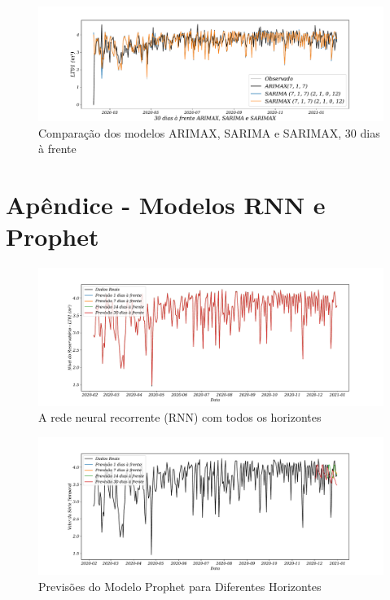 \begin{figure}[H]
	\centering
	\caption{Comparação dos modelos ARIMAX, SARIMA e SARIMAX, 30 dias à frente }
	\label{fig:60-ARIMAX-SARIMA-SARIMAX24}
	\includegraphics[width=1\linewidth]{Apendices/Figuras/modelagem-24h/30-ARIMAX-SARIMA-SARIMAX}
	
\end{figure}

\newpage

\section{Ap\^endice - Modelos RNN e Prophet }\label{sec:rnnprophet}

\begin{figure}[H]
	\centering
	\caption{A rede neural recorrente (RNN) com todos os horizontes }
	\label{fig:rnn}
	\includegraphics[width=1\linewidth]{Apendices/Figuras/modelagem-24h/RNN}
	
\end{figure}

\begin{figure}[H]
	\centering
	\caption{Previsões do Modelo Prophet para Diferentes Horizontes}
	\label{fig:prophet}
	\includegraphics[width=1\linewidth]{Apendices/Figuras/modelagem-24h/prophet}
	
\end{figure}